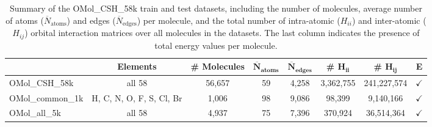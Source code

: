
\begin{table}[h]
\centering
\scriptsize
\begin{tabular}{l|c|c|c|c|c|c|c}
\toprule
\textbf{} & \textbf{Elements} & \textbf{\# Molecules} & $\mathbf{\overline{N}_{\text{atoms}}}$ & $\mathbf{\overline{N}_{\text{edges}}}$ & \textbf{\# $\mathbf{H_{ii}}$} & \textbf{\# $\mathbf{H_{ij}}$} & \textbf{E} \\
\midrule
OMol\_CSH\_58k   & all 58                    & 56,657 & 59   & 4,258    & 3,362,755      & 241,227,574        & $\checkmark$  \\
OMol\_common\_1k  & H, C, N, O, F, S, Cl, Br & 1,006  & 98    & 9,086  & 98,399 & 9,140,166 & $\checkmark$ \\
OMol\_all\_5k     & all 58                    & 4,937  &  75  & 7,396  & 370,924  & 36,514,364   & $\checkmark$ \\
\bottomrule
\end{tabular}
\vspace{0.3em}
\caption{Summary of the OMol\_CSH\_58k train and test datasets, including the number of molecules, average number of atoms ($\overline{N}_{\text{atoms}}$) and edges ($\overline{N}_{\text{edges}}$) per molecule, and the total number of intra-atomic ($H_{ii}$) and inter-atomic ($H_{ij}$) orbital interaction matrices over all molecules in the datasets. The last column indicates the presence of total energy values per molecule.}
\label{tab:omol_datasets}
\end{table}
